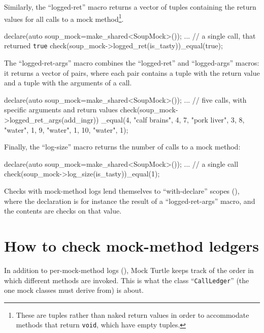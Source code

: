 \documentclass[twoside, a4paper, article]{memoir}
\begin{document}
Similarly, the ``logged-ret'' macro returns a vector of tuples containing the
return values for all calls to a mock method\footnote{These are tuples rather
  than naked return values in order to accommodate methods that return
  \texttt{void}, which have empty tuples.}.
\begin{cpplisting}
declare(auto soup_mock=make_shared<SoupMock>());
...
// a single call, that returned \texttt{true}
check(soup_mock->logged_ret(is_tasty))_equal({{true}});
\end{cpplisting}

The ``logged-ret-args'' macro combines the ``logged-ret'' and ``logged-args''
macros: it returns a vector of pairs, where each pair contains a tuple with the
return value and a tuple with the arguments of a call.
\begin{cpplisting}
declare(auto soup_mock=make_shared<SoupMock>());
...
// five calls, with specific arguments and return values
check(soup_mock->logged_ret_args(add_ingr))
  _equal({{{4}, {"calf brains", 4}},
          {{7}, {"pork liver", 3}},
          {{8}, {"water", 1}},
          {{9}, {"water", 1}},
          {{10}, {"water", 1}}});
\end{cpplisting}

Finally, the ``log-size'' macro returns the number of calls to a mock method:
\begin{cpplisting}
declare(auto soup_mock=make_shared<SoupMock>());
...
// a single call
check(soup_mock->log_size(is_tasty))_equal(1);
\end{cpplisting}

Checks with mock-method logs lend themselves to ``with-declare'' scopes
(), where the declaration is for instance the
result of a ``logged-ret-args'' macro, and the contents are checks on that
value.

\section{How to check mock-method ledgers}
\label{sec:check-mock-method-ledgers}

In addition to per-mock-method logs (), Mock
Turtle keeps track of the order in which different methods are invoked.  This
is what the class ``\texttt{CallLedger}'' (the one mock classes must derive
from) is about.
\end{document}
